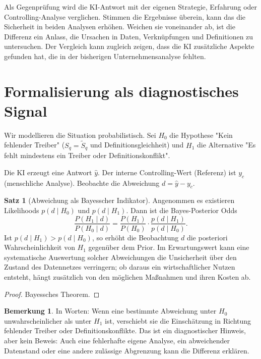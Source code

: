 \documentclass[a4paper,12pt,twoside]{report}
\theoremstyle{definition}
\newtheorem{bemerkung}[definition]{Bemerkung}
\newtheorem{satz}[definition]{Satz}
\begin{document}
Als Gegenprüfung wird die KI-Antwort mit der eigenen Strategie, Erfahrung oder Controlling-Analyse verglichen. Stimmen die Ergebnisse überein, kann das die Sicherheit in beiden Analysen erhöhen. Weichen sie voneinander ab, ist die Differenz ein Anlass, die Ursachen in Daten, Verknüpfungen und Definitionen zu untersuchen. Der Vergleich kann zugleich zeigen, dass die KI zusätzliche Aspekte gefunden hat, die in der bisherigen Unternehmensanalyse fehlten.

\section{Formalisierung als diagnostisches Signal}
Wir modellieren die Situation probabilistisch. Sei $H_0$ die Hypothese "Kein fehlender Treiber" (\(S_q = \tilde S_q\) und Definitionsgleichheit) und $H_1$ die Alternative "Es fehlt mindestens ein Treiber oder Definitionskonflikt".

Die KI erzeugt eine Antwort $\hat y$. Der interne Controlling-Wert (Referenz) ist $y_c$ (menschliche Analyse). Beobachte die Abweichung $d=\hat y-y_c$.

\begin{satz}[Abweichung als Bayesscher Indikator]
Angenommen es existieren Likelihoods $p(d\mid H_0)$ und $p(d\mid H_1)$. Dann ist die Bayes-Posterior Odds
\[
\frac{P(H_1\mid d)}{P(H_0\mid d)} = \frac{P(H_1)}{P(H_0)}\cdot\frac{p(d\mid H_1)}{p(d\mid H_0)}.
\]
Ist $p(d\mid H_1)>p(d\mid H_0)$, so erhöht die Beobachtung $d$ die posteriori Wahrscheinlichkeit von $H_1$ gegenüber dem Prior. Im Erwartungswert kann eine systematische Auswertung solcher Abweichungen die Unsicherheit über den Zustand des Datennetzes verringern; ob daraus ein wirtschaftlicher Nutzen entsteht, hängt zusätzlich von den möglichen Maßnahmen und ihren Kosten ab.
\end{satz}
\begin{proof}
Bayessches Theorem.
\end{proof}

\begin{bemerkung}
In Worten: Wenn eine bestimmte Abweichung unter \(H_0\) unwahrscheinlicher als unter \(H_1\) ist, verschiebt sie die Einschätzung in Richtung fehlender Treiber oder Definitionskonflikte. Das ist ein diagnostischer Hinweis, aber kein Beweis: Auch eine fehlerhafte eigene Analyse, ein abweichender Datenstand oder eine andere zulässige Abgrenzung kann die Differenz erklären.
\end{bemerkung}
\end{document}
